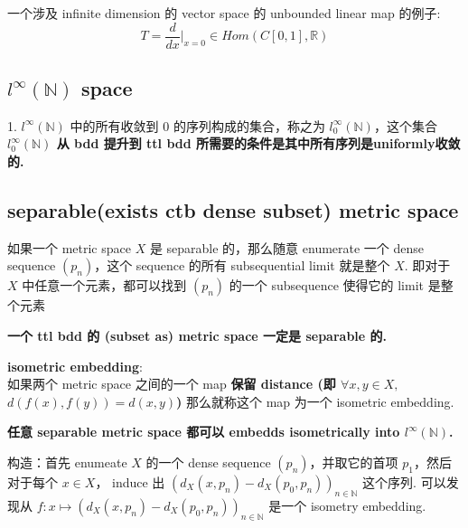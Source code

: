 \documentclass[lang=cn,11pt]{elegantbook}
\begin{document}
\begin{remark}
    一个涉及 infinite dimension 的 vector space 的 unbounded linear map 的例子: $$T = \frac{d}{dx}|_{x=0} \in Hom(C[0,1], \mathbb{R})$$
\end{remark}


\subsection{$l^{\infty}(\mathbb{N})$ space}

1. $l^{\infty}(\mathbb{N})$ 中的所有收敛到 0 的序列构成的集合，称之为 $l_0^{\infty}(\mathbb{N})$，这个集合 \textbf{$l_0^{\infty}(\mathbb{N})$ 从 bdd 提升到 ttl bdd 所需要的条件是其中所有序列是uniformly收敛的.}

\subsection{separable(exists ctb dense subset) metric space}

\begin{remark}
    如果一个 metric space $X$ 是 separable 的，那么随意 enumerate 一个 dense sequence $(p_n)$，这个 sequence 的所有 subsequential limit 就是整个 $X$. 即对于 $X$ 中任意一个元素，都可以找到 $(p_n)$ 的一个 subsequence 使得它的 limit 是整个元素
\end{remark}


\begin{theorem}
    \textbf{一个 ttl bdd 的 (subset as) metric space 一定是 separable 的.}
\end{theorem}

\begin{definition}
    \textbf{isometric embedding}: \\
    如果两个 metric space 之间的一个 map\textbf{ 保留 distance (即 $\forall x,y \in X, $ $d(f(x), f(y)) = d(x,y)$)} 那么就称这个 map 为一个 isometric embedding.
\end{definition}

\begin{theorem}
    \textbf{任意 separable metric space 都可以 embedds isometrically into $l^{\infty}(\mathbb{N})$.}
\end{theorem}

\proof 构造：首先 enumeate  $X$ 的一个 dense sequence $(p_n)$，并取它的首项 $p_1$，然后对于每个 $x \in X$， induce 出 $(d_X(x, p_n) - d_X(p_0, p_n))_{n \in \mathbb{N}}$ 这个序列. 可以发现从 $f: x \mapsto (d_X(x, p_n) - d_X(p_0, p_n))_{n \in \mathbb{N}}$ 是一个 isometry embedding. 
\end{document}
